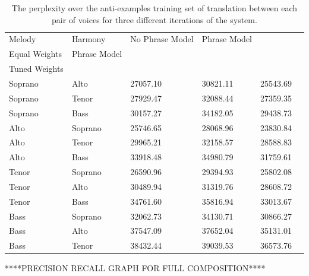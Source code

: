 \documentclass{sig-alternate}
\begin{document}
\begin{table}[h]
  \begin{center}
      \begin{tabular}{| l | l | l | l | l | l |}
      \hline
     Melody & Harmony & No Phrase Model & Phrase Model\\Equal Weights & Phrase Model\\Tuned Weights \\ \hline
     Soprano & Alto & 27057.10 & 30821.11 & 25543.69 \\ \hline
     Soprano & Tenor & 27929.47 & 32088.44 & 27359.35 \\ \hline
     Soprano & Bass & 30157.27 & 34182.05 & 29438.73 \\ \hline
     Alto & Soprano & 25746.65 & 28068.96 & 23830.84 \\ \hline
     Alto & Tenor & 29965.21 & 32158.57 & 28588.83 \\ \hline
     Alto & Bass & 33918.48 & 34980.79 & 31759.61 \\ \hline
     Tenor & Soprano & 26590.96 & 29394.93 & 25802.08 \\ \hline
     Tenor & Alto & 30489.94 & 31319.76 & 28608.72 \\ \hline
     Tenor & Bass & 34761.60 & 35816.94 & 33013.67 \\ \hline
     Bass & Soprano & 32062.73 & 34130.71 & 30866.27 \\ \hline
     Bass & Alto & 37547.09 & 37652.04 & 35131.01 \\ \hline
     Bass & Tenor & 38432.44 & 39039.53 & 36573.76 \\ \hline
      \end{tabular}
  \end{center}
  \caption{The perplexity over the anti-examples training set of translation between each pair of voices for three different iterations of the system.}
\end{table}

****PRECISION RECALL GRAPH FOR FULL COMPOSITION****
\\
\\
\\
\\
\\
\\
\\
\\
\\
\\
\\
\\
\\
\end{document}
